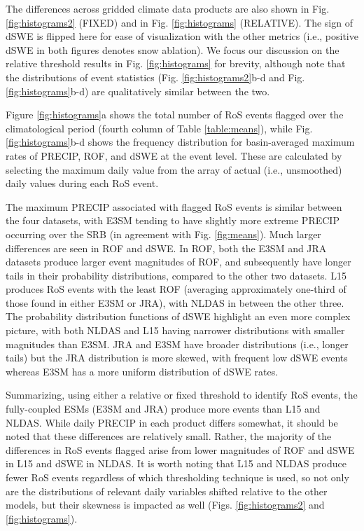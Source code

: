 \documentclass[nhess, manuscript]{copernicus}
\begin{document}
The differences across gridded climate data products are also shown in Fig. \ref{fig:histograms2} (FIXED) and in Fig. \ref{fig:histograms} (RELATIVE).
The sign of dSWE is flipped here for ease of visualization with the other metrics (i.e., positive dSWE in both figures denotes snow ablation).
We focus our discussion on the relative threshold results in Fig. \ref{fig:histograms} for brevity, although note that the distributions of event statistics (Fig. \ref{fig:histograms2}b-d and Fig. \ref{fig:histograms}b-d) are qualitatively similar between the two.

Figure \ref{fig:histograms}a shows the total number of RoS events flagged over the climatological period (fourth column of Table \ref{table:means}), while Fig. \ref{fig:histograms}b-d shows the frequency distribution for basin-averaged maximum rates of PRECIP, ROF, and dSWE at the event level.
These are calculated by selecting the maximum daily value from the array of actual (i.e., unsmoothed) daily values during each RoS event.

The maximum PRECIP associated with flagged RoS events is similar between the four datasets, with E3SM tending to have slightly more extreme PRECIP occurring over the SRB (in agreement with Fig. \ref{fig:means}).
Much larger differences are seen in ROF and dSWE.
In ROF, both the E3SM and JRA datasets produce larger event magnitudes of ROF, and subsequently have longer tails in their probability distributions, compared to the other two datasets.
L15 produces RoS events with the least ROF (averaging approximately one-third of those found in either E3SM or JRA), with NLDAS in between the other three.
The probability distribution functions of dSWE highlight an even more complex picture, with both NLDAS and L15 having narrower distributions with smaller magnitudes than E3SM.
JRA and E3SM have broader distributions (i.e., longer tails) but the JRA distribution is more skewed, with frequent low dSWE events whereas E3SM has a more uniform distribution of dSWE rates.

Summarizing, using either a relative or fixed threshold to identify RoS events, the fully-coupled ESMs (E3SM and JRA) produce more events than L15 and NLDAS.
While daily PRECIP in each product differs somewhat, it should be noted that these differences are relatively small.
Rather, the majority of the differences in RoS events flagged arise from lower magnitudes of ROF and dSWE in L15 and dSWE in NLDAS.
It is worth noting that L15 and NLDAS produce fewer RoS events regardless of which thresholding technique is used, so not only are the distributions of relevant daily variables shifted relative to the other models, but their skewness is impacted as well (Figs. \ref{fig:histograms2} and \ref{fig:histograms}).
\end{document}
